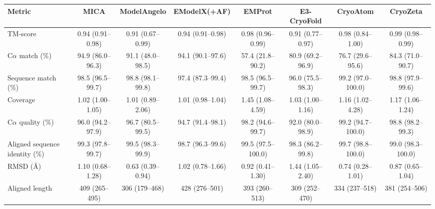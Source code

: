 \begin{tabular}{lccccccc}
\toprule
Metric & MICA & ModelAngelo & EModelX(+AF) & EMProt & E3-CryoFold & CryoAtom & CryoZeta \\
\midrule
TM-score & 0.94 (0.91--0.98) & 0.91 (0.67--0.99) & 0.94 (0.91--0.98) & 0.98 (0.96--0.99) & 0.91 (0.77--0.97) & 0.98 (0.84--1.00) & 0.99 (0.98--0.99) \\
C$\alpha$ match (\%) & 94.9 (86.0--96.3) & 91.1 (48.0--98.5) & 94.1 (90.1--97.6) & 57.4 (21.8--90.2) & 80.9 (69.2--96.9) & 76.7 (29.6--95.6) & 84.3 (71.0--90.7) \\
Sequence match (\%) & 98.5 (96.5--99.7) & 98.8 (98.1--99.8) & 97.4 (87.3--99.4) & 98.5 (96.5--99.7) & 96.0 (75.5--98.3) & 99.2 (97.0--100.0) & 98.8 (97.9--99.6) \\
Coverage & 1.02 (1.00--1.05) & 1.01 (0.89--2.06) & 1.01 (0.98--1.04) & 1.45 (1.08--4.59) & 1.03 (1.00--1.16) & 1.16 (1.02--4.28) & 1.17 (1.06--1.24) \\
C$\alpha$ quality (\%) & 96.0 (94.2--97.9) & 96.7 (80.5--99.5) & 94.7 (91.4--98.1) & 98.2 (94.6--99.7) & 92.0 (80.0--98.9) & 99.2 (94.7--100.0) & 98.8 (98.2--99.3) \\
Aligned sequence identity (\%) & 99.3 (97.8--99.7) & 99.5 (98.3--99.9) & 98.7 (96.3--99.6) & 99.5 (97.5--100.0) & 98.3 (86.2--99.8) & 99.7 (98.8--100.0) & 99.0 (98.3--100.0) \\
RMSD (\AA) & 1.10 (0.68--1.28) & 0.63 (0.39--0.94) & 1.02 (0.78--1.66) & 0.92 (0.41--1.30) & 1.44 (1.05--2.40) & 0.74 (0.28--1.01) & 0.87 (0.65--1.04) \\
Aligned length & 409 (265--495) & 306 (179--468) & 428 (276--501) & 393 (260--513) & 309 (252--470) & 334 (237--518) & 381 (254--506) \\
\bottomrule
\end{tabular}
